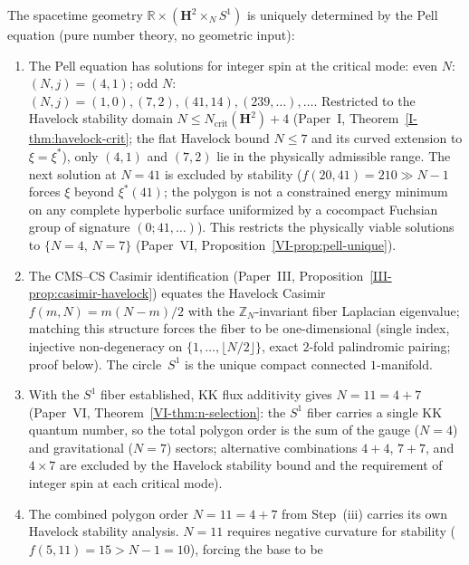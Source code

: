 \begin{proposition}
\label{prop:spacetime}
The spacetime geometry
$\mathbb{R} \times (\mathbf{H}^2 \times_N S^1)$ is uniquely
determined by the Pell equation (pure number theory,
no geometric input):
\begin{enumerate}
\item[\textnormal{(i)}]
  The Pell equation has solutions for integer spin at the
  critical mode: even $N$: $(N,j) = (4,1)$; odd $N$:
  $(N,j) = (1,0), (7,2), (41,14), (239,\ldots),\ldots$.
  Restricted to the Havelock stability domain $N \le N_{\mathrm{crit}}(\mathbf{H}^2) + 4$
  (Paper~I, Theorem~\ref*{I-thm:havelock-crit}; the flat
  Havelock bound $N \le 7$ and its curved extension to
  $\xi = \xi^*$), only $(4, 1)$ and $(7, 2)$ lie in the
  physically admissible range.  The next solution at $N = 41$
  is excluded by stability ($f(20, 41) = 210 \gg N{-}1$ forces
  $\xi$ beyond $\xi^*(41)$; the polygon is not a constrained
  energy minimum on any complete hyperbolic surface uniformized
  by a cocompact Fuchsian group of signature $(0; 41, \ldots)$).
  This restricts the physically viable solutions to
  $\{N = 4, \, N = 7\}$
  (Paper~VI, Proposition~\ref*{VI-prop:pell-unique}).
\item[\textnormal{(ii)}]
  The CMS--CS Casimir identification
  (Paper~III, Proposition~\ref*{III-prop:casimir-havelock})
  equates the Havelock Casimir $f(m,N) = m(N{-}m)/2$ with
  the $\mathbb{Z}_N$-invariant fiber Laplacian eigenvalue;
  matching this structure forces the fiber to be
  one-dimensional (single index, injective non-degeneracy
  on $\{1,\ldots,\lfloor N/2\rfloor\}$, exact $2$-fold
  palindromic pairing; proof below).  The circle~$S^1$
  is the unique compact connected $1$-manifold.
\item[\textnormal{(iii)}]
  With the $S^1$ fiber established, KK flux additivity
  gives $N = 11 = 4 + 7$
  (Paper~VI, Theorem~\ref*{VI-thm:n-selection}:
  the $S^1$ fiber carries a single KK quantum number,
  so the total polygon order is the sum of the
  gauge ($N = 4$) and gravitational ($N = 7$) sectors;
  alternative combinations $4{+}4$, $7{+}7$, and $4 \times 7$
  are excluded by the Havelock stability bound and the
  requirement of integer spin at each critical mode).
\item[\textnormal{(iv)}]
  The combined polygon order $N = 11 = 4 + 7$ from Step~(iii)
  carries its own Havelock stability analysis.
  $N = 11$ requires negative curvature for stability
  ($f(5,11) = 15 > N{-}1 = 10$), forcing the base to be

\end{enumerate}
\end{proposition}
